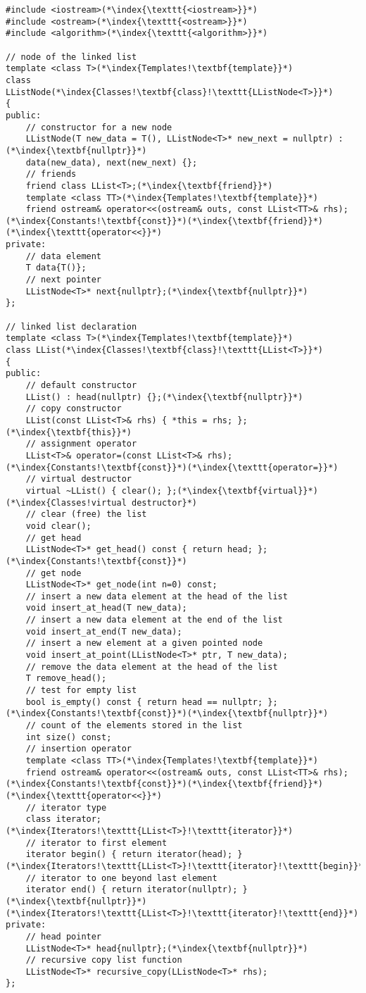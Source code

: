 \documentclass[10pt]{article}
\begin{document}
\begin{lstlisting}
#include <iostream>(*\index{\texttt{<iostream>}}*)
#include <ostream>(*\index{\texttt{<ostream>}}*)
#include <algorithm>(*\index{\texttt{<algorithm>}}*)

// node of the linked list
template <class T>(*\index{Templates!\textbf{template}}*)
class LListNode(*\index{Classes!\textbf{class}!\texttt{LListNode<T>}}*)
{
public:
    // constructor for a new node
    LListNode(T new_data = T(), LListNode<T>* new_next = nullptr) :(*\index{\textbf{nullptr}}*)
    data(new_data), next(new_next) {};
    // friends
    friend class LList<T>;(*\index{\textbf{friend}}*)
    template <class TT>(*\index{Templates!\textbf{template}}*)
    friend ostream& operator<<(ostream& outs, const LList<TT>& rhs);(*\index{Constants!\textbf{const}}*)(*\index{\textbf{friend}}*)(*\index{\texttt{operator<<}}*)
private:
    // data element
    T data{T()};
    // next pointer
    LListNode<T>* next{nullptr};(*\index{\textbf{nullptr}}*)
};

// linked list declaration
template <class T>(*\index{Templates!\textbf{template}}*)
class LList(*\index{Classes!\textbf{class}!\texttt{LList<T>}}*)
{
public:
    // default constructor
    LList() : head(nullptr) {};(*\index{\textbf{nullptr}}*)
    // copy constructor
    LList(const LList<T>& rhs) { *this = rhs; };(*\index{\textbf{this}}*)
    // assignment operator
    LList<T>& operator=(const LList<T>& rhs);(*\index{Constants!\textbf{const}}*)(*\index{\texttt{operator=}}*)
    // virtual destructor
    virtual ~LList() { clear(); };(*\index{\textbf{virtual}}*)(*\index{Classes!virtual destructor}*)
    // clear (free) the list
    void clear();
    // get head
    LListNode<T>* get_head() const { return head; };(*\index{Constants!\textbf{const}}*)
    // get node
    LListNode<T>* get_node(int n=0) const;
    // insert a new data element at the head of the list
    void insert_at_head(T new_data);
    // insert a new data element at the end of the list
    void insert_at_end(T new_data);
    // insert a new element at a given pointed node
    void insert_at_point(LListNode<T>* ptr, T new_data);
    // remove the data element at the head of the list
    T remove_head();
    // test for empty list
    bool is_empty() const { return head == nullptr; };(*\index{Constants!\textbf{const}}*)(*\index{\textbf{nullptr}}*)
    // count of the elements stored in the list
    int size() const;
    // insertion operator
    template <class TT>(*\index{Templates!\textbf{template}}*)
    friend ostream& operator<<(ostream& outs, const LList<TT>& rhs);(*\index{Constants!\textbf{const}}*)(*\index{\textbf{friend}}*)(*\index{\texttt{operator<<}}*)
    // iterator type
    class iterator;(*\index{Iterators!\texttt{LList<T>}!\texttt{iterator}}*)
    // iterator to first element
    iterator begin() { return iterator(head); }(*\index{Iterators!\texttt{LList<T>}!\texttt{iterator}!\texttt{begin}}*)
    // iterator to one beyond last element
    iterator end() { return iterator(nullptr); }(*\index{\textbf{nullptr}}*)(*\index{Iterators!\texttt{LList<T>}!\texttt{iterator}!\texttt{end}}*)
private:
    // head pointer
    LListNode<T>* head{nullptr};(*\index{\textbf{nullptr}}*)
    // recursive copy list function
    LListNode<T>* recursive_copy(LListNode<T>* rhs);
};
\end{lstlisting}
\end{document}

